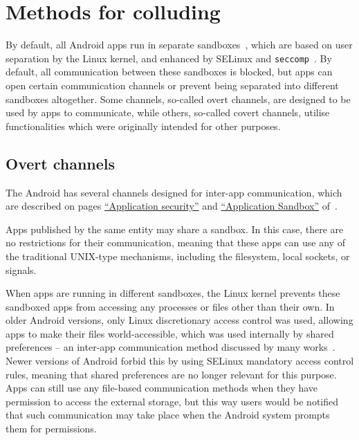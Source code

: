 \documentclass[article]{aaltoseries}
\newcommand{\sref}[1]{section~\ref{#1}}
\renewcommand\gls\cgls
\begin{document}
\section{Methods for colluding}
\label{sec:methods}

By default, all Android apps run in separate sandboxes~\cite[\href{https://source.android.com/security/overview/app-security}{``Application security''}]{AOSPsecurity}, which are based on user separation by the Linux kernel, and enhanced by SELinux and \texttt{seccomp}~\cite[\href{https://source.android.com/security/app-sandbox}{``Application Sandbox''}]{AOSPsecurity}. By default, all communication between these sandboxes is blocked, but apps can open certain communication channels or prevent being separated into different sandboxes altogether. Some channels, so-called overt channels, are designed to be used by apps to communicate, while others, so-called covert channels, utilise functionalities which were originally intended for other purposes.

\subsection{Overt channels}
\label{sec:overt}

The Android \gls{os} has several channels designed for inter-app communication, which are described on pages \href{https://source.android.com/security/overview/app-security}{``Application security''} and \href{https://source.android.com/security/app-sandbox}{``Application Sandbox''} of~\cite{AOSPsecurity}.

Apps published by the same entity may share a sandbox. In this case, there are no restrictions for their communication, meaning that these apps can use any of the traditional UNIX-type mechanisms, including the filesystem, local sockets, or signals.

When apps are running in different sandboxes, the Linux kernel prevents these sandboxed apps from accessing any processes or files other than their own. In older Android versions, only Linux discretionary access control was used, allowing apps to make their files world-accessible, which was used internally by shared preferences -- an inter-app communication method discussed by many works~\cite{Bhandari2017, Asavoae2017}. Newer versions of Android forbid this by using SELinux mandatory access control rules, meaning that shared preferences are no longer relevant for this purpose. Apps can still use any file-based communication methods when they have permission to access the external storage, but this way users would be notified that such communication may take place when the Android system prompts them for permissions.
\end{document}
